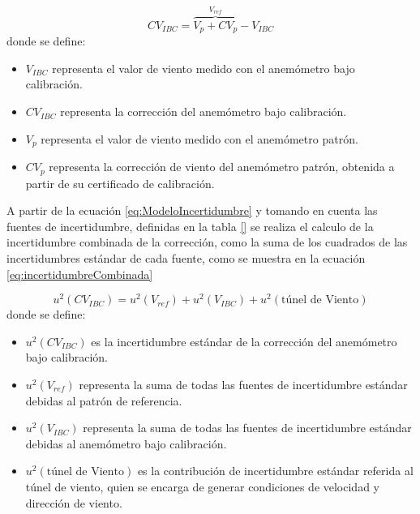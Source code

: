 \begin{equation}
    CV_{IBC} = \overbrace{V_{p} + CV_{p}}^{V_{ref}} - V_{IBC}
    \label{eq:ModeloIncertidumbre}
\end{equation}
donde se define:

\begin{itemize}
    \item $V_{IBC}$ representa el valor de viento medido con el anemómetro bajo calibración.
    \item $CV_{IBC}$ representa la corrección del anemómetro bajo calibración.
    \item $V_{p}$ representa el valor de viento medido con el anemómetro patrón.
    \item $CV_{p}$ representa la corrección de viento del anemómetro patrón, obtenida a partir de su certificado de calibración.
\end{itemize}

A partir de la ecuación \ref{eq:ModeloIncertidumbre} y tomando en cuenta las fuentes de incertidumbre, definidas en la tabla \ref{} se realiza el calculo de la incertidumbre combinada de la corrección, como la suma de los cuadrados de las incertidumbres estándar de cada fuente, como se muestra en la ecuación \ref{eq:incertidumbreCombinada}
\text

\begin{equation}
    u^{2}(CV_{IBC}) = u^{2}(V_{ref})+u^{2}(V_{IBC})+u^{2}(\text{túnel de Viento})
    \label{eq:incertidumbreCombinada}
\end{equation}
donde se define:

\begin{itemize}
    \item $u^{2}(CV_{IBC})$ es la incertidumbre estándar de la corrección del anemómetro bajo calibración.
    \item $u^{2}(V_{ref})$ representa la suma de todas las fuentes de incertidumbre estándar debidas al patrón de referencia.
    \item $u^{2}(V_{IBC})$ representa la suma de todas las fuentes de incertidumbre estándar debidas al anemómetro bajo calibración.
    \item $u^{2}(\text{túnel de Viento})$ es la contribución de incertidumbre estándar referida al túnel de viento, quien se encarga de generar condiciones de velocidad y dirección de viento.
\end{itemize}

